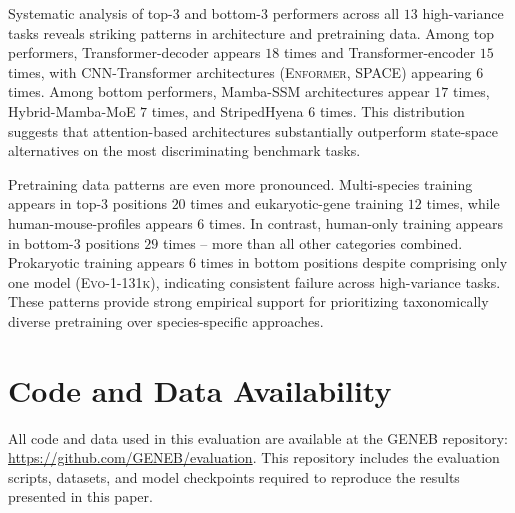 \documentclass{llmxive}
\begin{document}
Systematic analysis of top-3 and bottom-3 performers across all
$13$ high-variance tasks reveals striking patterns in
architecture and pretraining data. Among top performers,
Transformer-decoder appears $18$ times and Transformer-encoder
$15$ times, with CNN-Transformer architectures
(\textsc{Enformer}, \textsc{SPACE}) appearing $6$ times. Among
bottom performers, Mamba-SSM architectures appear $17$ times,
Hybrid-Mamba-MoE $7$ times, and StripedHyena $6$ times. This
distribution suggests that attention-based architectures
substantially outperform state-space alternatives on the most
discriminating benchmark tasks.

Pretraining data patterns are even more pronounced. Multi-species
training appears in top-3 positions $20$ times and
eukaryotic-gene training $12$ times, while human-mouse-profiles
appears $6$ times. In contrast, human-only training appears in
bottom-3 positions $29$ times -- more than all other categories
combined. Prokaryotic training appears $6$ times in bottom
positions despite comprising only one model
(\textsc{Evo-1-131k}), indicating consistent failure across
high-variance tasks. These patterns provide strong empirical
support for prioritizing taxonomically diverse pretraining over
species-specific approaches.

\section*{Code and Data Availability}
All code and data used in this evaluation are available at the GENEB repository: \url{https://github.com/GENEB/evaluation}. This repository includes the evaluation scripts, datasets, and model checkpoints required to reproduce the results presented in this paper.
\end{document}
